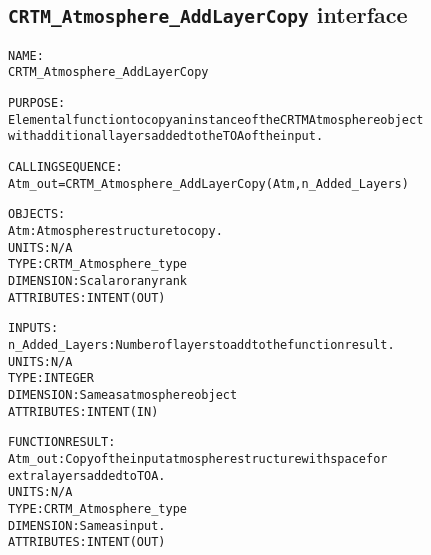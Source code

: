 \subsection{\texttt{CRTM\_Atmosphere\_AddLayerCopy} interface}
  \label{sec:CRTM_Atmosphere_AddLayerCopy_interface}
  \begin{alltt}
 
  NAME:
        CRTM_Atmosphere_AddLayerCopy
 
  PURPOSE:
        Elemental function to copy an instance of the CRTM Atmosphere object
        with additional layers added to the TOA of the input.
 
  CALLING SEQUENCE:
        Atm_out = CRTM_Atmosphere_AddLayerCopy( Atm, n_Added_Layers )
 
  OBJECTS:
        Atm:             Atmosphere structure to copy.
                         UNITS:      N/A
                         TYPE:       CRTM_Atmosphere_type
                         DIMENSION:  Scalar or any rank
                         ATTRIBUTES: INTENT(OUT)
 
  INPUTS:
        n_Added_Layers:  Number of layers to add to the function result.
                         UNITS:      N/A
                         TYPE:       INTEGER
                         DIMENSION:  Same as atmosphere object
                         ATTRIBUTES: INTENT(IN)
 
  FUNCTION RESULT:
        Atm_out:         Copy of the input atmosphere structure with space for
                         extra layers added to TOA.
                         UNITS:      N/A
                         TYPE:       CRTM_Atmosphere_type
                         DIMENSION:  Same as input.
                         ATTRIBUTES: INTENT(OUT)
 
 
  \end{alltt}
